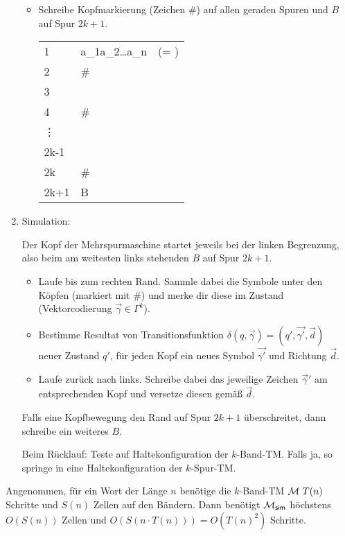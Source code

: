 \begin{Bemerkung}
\begin{enumerate}
	 \begin{itemize}
	  \item Schreibe Kopfmarkierung (Zeichen \#) auf allen geraden Spuren und $B$ auf Spur $2k+1$.
	  
	  	\begin{tabular}{*2{M{l}}}
		1 & a_1a_2\dots a_n~~(= )\\
		2 & \#\\
		3 & \blank\\
		4 & \#\\
		\vdots\\
		2k-1 & \blank\\
		2k & \#\\
		2k+1 & \blank B \blank
	\end{tabular} 
	 \end{itemize}
	 
    \item Simulation:

	Der Kopf der Mehrspurmaschine startet jeweils bei der linken Begrenzung, also beim am weitesten links stehenden $B$ auf Spur $2k+1$.
	\begin{itemize}
		\item Laufe bis zum rechten Rand.
		Sammle dabei die Symbole unter den Köpfen (markiert mit \#) und merke dir diese im Zustand (Vektorcodierung $\overrightarrow{\gamma} \in \Gamma^k$).
		\item Bestimme Resultat von Transitionsfunktion $\delta(q,\overrightarrow{\gamma})=(q',\overrightarrow{\gamma'},\overrightarrow{d})$\\
		neuer Zustand $q'$, für jeden Kopf ein neues Symbol $\overrightarrow{\gamma'}$ und Richtung $\overrightarrow{d}$.
		\item Laufe zurück nach links.
		Schreibe dabei das jeweilige Zeichen $\overrightarrow{\gamma}'$ am entsprechenden Kopf und versetze diesen gemäß $\overrightarrow{d}$.
	\end{itemize}
	Falls eine Kopfbewegung den Rand auf Spur $2k+1$ überschreitet, dann schreibe ein weiteres $B$.
	
	Beim Rücklauf: Teste auf Haltekonfiguration der $k$-Band-\ac{TM}.
	Falls ja, so springe in eine Haltekonfiguration der $k$-Spur-\ac{TM}.
% 	
	\qedhere
	\end{enumerate}
\end{Bemerkung}


\begin{Bemerkung}
	Angenommen, für ein Wort der Länge $n$ benötige die $k$-Band-\ac{TM} $\mathcal{M}\ T(n)$ Schritte und $S(n)$ Zellen auf den Bändern.
	Dann benötigt $\mathcal{M}_\mathsf{sim}$ höchstens $O(S(n))$ Zellen und $O(S(n\cdot T(n)))=O(T(n)^2)$ Schritte.
\end{Bemerkung}





